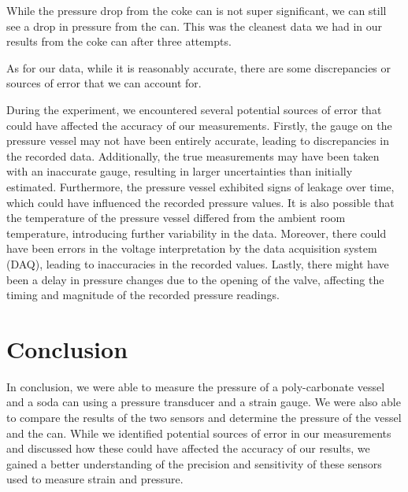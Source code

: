 \documentclass{article}
\begin{document}
While the pressure drop from the coke can is not super significant, we can still see a drop in pressure from the can. This was the cleanest data we had in our results from the coke can after three attempts.

As for our data, while it is reasonably accurate, there are some discrepancies or sources of error that we can account for.

During the experiment, we encountered several potential sources of error that could have affected the accuracy of our measurements. Firstly, the gauge on the pressure vessel may not have been entirely accurate, leading to discrepancies in the recorded data. Additionally, the true measurements may have been taken with an inaccurate gauge, resulting in larger uncertainties than initially estimated. Furthermore, the pressure vessel exhibited signs of leakage over time, which could have influenced the recorded pressure values. It is also possible that the temperature of the pressure vessel differed from the ambient room temperature, introducing further variability in the data. Moreover, there could have been errors in the voltage interpretation by the data acquisition system (DAQ), leading to inaccuracies in the recorded values. Lastly, there might have been a delay in pressure changes due to the opening of the valve, affecting the timing and magnitude of the recorded pressure readings.


\section{Conclusion}

In conclusion, we were able to measure the pressure of a poly-carbonate vessel and a soda can using a pressure transducer and a strain gauge. We were also able to compare the results of the two sensors and determine the pressure of the vessel and the can. While we identified potential sources of error in our measurements and discussed how these could have affected the accuracy of our results, we gained a better understanding of the precision and sensitivity of these sensors used to measure strain and pressure.
\end{document}
